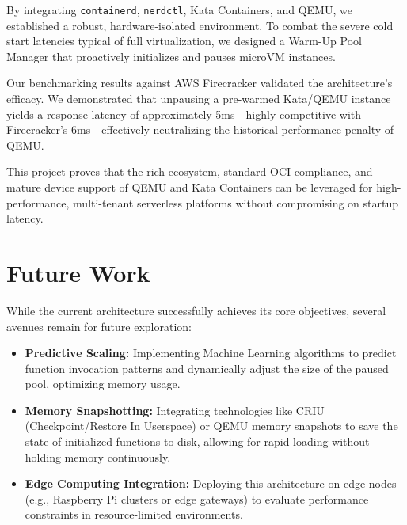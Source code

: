 \documentclass[12pt,a4paper]{report}
\begin{document}
By integrating \texttt{containerd}, \texttt{nerdctl}, Kata Containers, and QEMU, we established a robust, hardware-isolated environment. To combat the severe cold start latencies typical of full virtualization, we designed a Warm-Up Pool Manager that proactively initializes and pauses microVM instances.

Our benchmarking results against AWS Firecracker validated the architecture's efficacy. We demonstrated that unpausing a pre-warmed Kata/QEMU instance yields a response latency of approximately 5ms—highly competitive with Firecracker's 6ms—effectively neutralizing the historical performance penalty of QEMU.

This project proves that the rich ecosystem, standard OCI compliance, and mature device support of QEMU and Kata Containers can be leveraged for high-performance, multi-tenant serverless platforms without compromising on startup latency.

\section{Future Work}
While the current architecture successfully achieves its core objectives, several avenues remain for future exploration:
\begin{itemize}
    \item \textbf{Predictive Scaling:} Implementing Machine Learning algorithms to predict function invocation patterns and dynamically adjust the size of the paused pool, optimizing memory usage.
    \item \textbf{Memory Snapshotting:} Integrating technologies like CRIU (Checkpoint/Restore In Userspace) or QEMU memory snapshots to save the state of initialized functions to disk, allowing for rapid loading without holding memory continuously.
    \item \textbf{Edge Computing Integration:} Deploying this architecture on edge nodes (e.g., Raspberry Pi clusters or edge gateways) to evaluate performance constraints in resource-limited environments.
\end{itemize}
\end{document}
